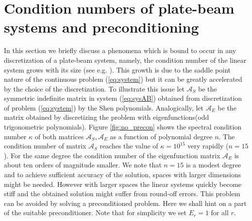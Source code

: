 \documentclass{marine_2015}
\begin{document}
\section{Condition numbers of plate-beam systems and preconditioning}
\label{sec:lbb}
In this section we briefly discuss a phenomena which is bound to occur in any
discretization of a plate-beam system, namely, the condition number of the linear system 
grows with its size (see e.g. \cite{benzi}). This growth is due to the saddle point 
nature of the continuous problem (\ref{eq:system}) but it can be greatly accelerated 
by the choice of the discretization. To illustrate this issue let $\mathcal{A}_S$ be the symmetric
indefinite matrix in system (\ref{eq:sysAB}) obtained from discretization of
problem (\ref{eq:system}) by the Shen polynomials. Analogically, let
$\mathcal{A}_E$ be the matrix obtained by discretizing the problem with
eigenfunctions(odd trigonometric polynomials). Figure \ref{fig:no_precon} shows the 
spectral condition number $\kappa$ of both matrices $\mathcal{A}_S, \mathcal{A}_E$ 
as a function of polynomial degree $n$. The condition number of matrix
$\mathcal{A}_S$ reaches the value of $\kappa=10^{15}$ very rapidly ($n=15$). For
the same degree the condition number of the eigenfunction matrix $\mathcal{A}_E$ is about ten 
orders of magnitude smaller. We note that $n=15$ is a modest degree and to achieve
sufficient accuracy of the solution, spaces with larger dimensions might be
needed. However with larger spaces the linear systems quickly become stiff and
the obtained solution might suffer from round-off errors. This problem can be
avoided by solving a preconditioned problem. Here we shall hint on a part of the
suitable preconditioner. Note that for simplicity we set $E_r=1$ for all $r$.
\end{document}
